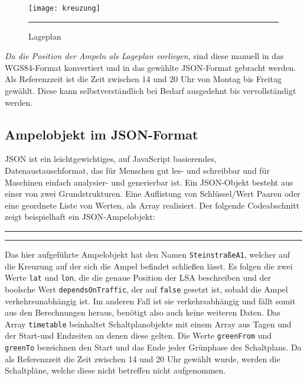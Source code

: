 \begin{figure}[H]  
    \centering  
    \texttt{[image: kreuzung]} 
    \rule{35em}{0.5pt}
    \caption{Lageplan}
    \label{fig:kreuzung}
\end{figure}
\textit{Da die Position der Ampeln als Lageplan vorliegen, }sind diese manuell in das WGS84-Format konvertiert und in das gewählte \gls{JSON}-Format gebracht werden.
Als Referenzzeit ist die Zeit zwischen 14 und 20 Uhr von Montag bis Freitag gewählt. Diese kann selbstverständlich bei Bedarf ausgedehnt bis vervollständigt werden.
%
%
\subsection[Ampelobjekt im JSON-Format]{Ampelobjekt im \gls{JSON}-Format}
\gls{JSON} ist ein leichtgewichtiges, auf JavaScript basierendes, Datenaustauschformat, das für Menschen gut les- und schreibbar und für Maschinen einfach analysier- und generierbar ist. Ein \gls{JSON}-Objekt besteht aus einer von zwei Grundstrukturen. Eine Auflistung von Schlüssel/Wert Paaren oder eine geordnete Liste von Werten, als Array realisiert. Der folgende Codeabschnitt zeigt beispielhaft ein \gls{JSON}-Ampelobjekt:  
\begin{center}
\rule{35em}{0.5pt}

\rule{35em}{0.5pt}
\end{center}
Das hier aufgeführte Ampelobjekt hat den Namen \texttt{SteinstraßeA1}, welcher auf die Kreuzung auf der sich die Ampel befindet schließen lässt. Es folgen die zwei Werte \texttt{lat} und \texttt{lon}, die die genaue Position der \gls{LSA} beschreiben und der boolsche Wert \texttt{dependsOnTraffic}, der auf \texttt{false} gesetzt ist, sobald die Ampel verkehrsunabhängig ist. Im anderen Fall ist sie verkehrsabhängig und fällt somit aus den Berechnungen heraus, benötigt also auch keine weiteren Daten. Das Array \texttt{timetable} beinhaltet Schaltplanobjekte mit einem Array aus Tagen und der Start-und Endzeiten an denen diese gelten. Die Werte \texttt{greenFrom} und \texttt{greenTo} bezeichnen den Start und das Ende jeder Grünphase des Schaltplans. Da als Referenzzeit die Zeit zwischen 14 und 20 Uhr gewählt wurde, werden die Schaltpläne, welche diese nicht betreffen nicht aufgenommen.
\clearpage
